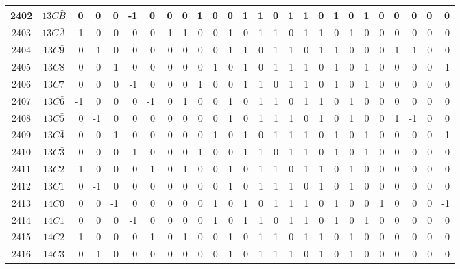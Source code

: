 \documentclass[12 pt]{article}%
\begin{document}
\begin{tiny}
\begin{centering}
\begin{longtable}{|c|c||rrrrrrrrrrrrrrrrrrrrrrrr|}
      \hline
      2402 & $13C\bar B$ & 0 & 0 & 0 & -1 & 0 & 0 & 0 & 1 & 0 & 0 & 1 & 1 & 0 & 1 & 1 & 0 & 1 & 0 & 1 & 0 & 0 & 0 & 0 & 0 \\
      \hline
      2403 & $13C\bar A$ & -1 & 0 & 0 & 0 & 0 & -1 & 1 & 0 & 0 & 1 & 0 & 1 & 1 & 0 & 1 & 1 & 0 & 1 & 0 & 0 & 0 & 0 & 0 & 0 \\
      \hline
      2404 & $13C\bar9$ & 0 & -1 & 0 & 0 & 0 & 0 & 0 & 0 & 0 & 1 & 1 & 0 & 1 & 1 & 0 & 1 & 1 & 0 & 0 & 0 & 1 & -1 & 0 & 0 \\
      \hline
      2405 & $13C\bar8$ & 0 & 0 & -1 & 0 & 0 & 0 & 0 & 0 & 1 & 0 & 1 & 0 & 1 & 1 & 1 & 0 & 1 & 0 & 1 & 0 & 0 & 0 & 0 & -1 \\
      \hline
      2406 & $13C\bar7$ & 0 & 0 & 0 & -1 & 0 & 0 & 0 & 1 & 0 & 0 & 1 & 1 & 0 & 1 & 1 & 0 & 1 & 0 & 1 & 0 & 0 & 0 & 0 & 0 \\
      \hline
      2407 & $13C\bar6$ & -1 & 0 & 0 & 0 & -1 & 0 & 1 & 0 & 0 & 1 & 0 & 1 & 1 & 0 & 1 & 1 & 0 & 1 & 0 & 0 & 0 & 0 & 0 & 0 \\
      \hline
      2408 & $13C\bar5$ & 0 & -1 & 0 & 0 & 0 & 0 & 0 & 0 & 0 & 1 & 0 & 1 & 1 & 1 & 0 & 1 & 0 & 1 & 0 & 0 & 1 & -1 & 0 & 0 \\
      \hline
      2409 & $13C\bar4$ & 0 & 0 & -1 & 0 & 0 & 0 & 0 & 0 & 1 & 0 & 1 & 0 & 1 & 1 & 1 & 0 & 1 & 0 & 1 & 0 & 0 & 0 & 0 & -1 \\
      \hline
      2410 & $13C\bar3$ & 0 & 0 & 0 & -1 & 0 & 0 & 0 & 1 & 0 & 0 & 1 & 1 & 0 & 1 & 1 & 0 & 1 & 0 & 1 & 0 & 0 & 0 & 0 & 0 \\
      \hline
      2411 & $13C\bar2$ & -1 & 0 & 0 & 0 & -1 & 0 & 1 & 0 & 0 & 1 & 0 & 1 & 1 & 0 & 1 & 1 & 0 & 1 & 0 & 0 & 0 & 0 & 0 & 0 \\
      \hline
      2412 & $13C\bar1$ & 0 & -1 & 0 & 0 & 0 & 0 & 0 & 0 & 0 & 1 & 0 & 1 & 1 & 1 & 0 & 1 & 0 & 1 & 0 & 0 & 0 & 0 & 0 & 0 \\
      \hline
      2413 & $14C0$ & 0 & 0 & -1 & 0 & 0 & 0 & 0 & 0 & 1 & 0 & 1 & 0 & 1 & 1 & 1 & 0 & 1 & 0 & 0 & 1 & 0 & 0 & 0 & -1 \\
      \hline
      2414 & $14C1$ & 0 & 0 & 0 & -1 & 0 & 0 & 0 & 0 & 1 & 0 & 1 & 1 & 0 & 1 & 1 & 0 & 1 & 0 & 1 & 0 & 0 & 0 & 0 & 0 \\
      \hline
      2415 & $14C2$ & -1 & 0 & 0 & 0 & -1 & 0 & 1 & 0 & 0 & 1 & 0 & 1 & 1 & 0 & 1 & 1 & 0 & 1 & 0 & 0 & 0 & 0 & 0 & 0 \\
      \hline
      2416 & $14C3$ & 0 & -1 & 0 & 0 & 0 & 0 & 0 & 0 & 0 & 1 & 0 & 1 & 1 & 1 & 0 & 1 & 0 & 1 & 0 & 0 & 0 & 0 & 0 & 0 \\

\end{longtable}
\end{centering}
\end{tiny}
\end{document}
